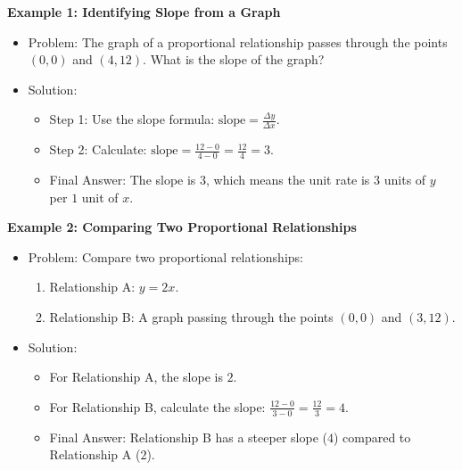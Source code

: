 \documentclass[12pt]{article}
\begin{document}
\begin{tcolorbox}[colframe=black!60, colback=white, 
coltitle=black, colbacktitle=black!15, fonttitle=\bfseries\Large, 
title=Examples, halign title=center, left=10pt, right=10pt, top=10pt, bottom=15pt]
\textbf{Example 1: Identifying Slope from a Graph}
\begin{itemize}
    \item Problem: The graph of a proportional relationship passes through the points \((0, 0)\) and \((4, 12)\). What is the slope of the graph?
    \item Solution:
    \begin{itemize}
        \item Step 1: Use the slope formula: \(\text{slope} = \frac{\Delta y}{\Delta x}\).
        \item Step 2: Calculate: \(\text{slope} = \frac{12 - 0}{4 - 0} = \frac{12}{4} = 3\).
        \item Final Answer: The slope is \(3\), which means the unit rate is \(3\) units of \(y\) per \(1\) unit of \(x\).
    \end{itemize}
\end{itemize}

\textbf{Example 2: Comparing Two Proportional Relationships}
\begin{itemize}
    \item Problem: Compare two proportional relationships:
    \begin{enumerate}
        \item Relationship A: \(y = 2x\).
        \item Relationship B: A graph passing through the points \((0, 0)\) and \((3, 12)\).
    \end{enumerate}
    \item Solution:
    \begin{itemize}
        \item For Relationship A, the slope is \(2\).
        \item For Relationship B, calculate the slope: \(\frac{12 - 0}{3 - 0} = \frac{12}{3} = 4\).
        \item Final Answer: Relationship B has a steeper slope (\(4\)) compared to Relationship A (\(2\)).
    \end{itemize}
\end{itemize}
\end{tcolorbox}

\vspace{1em}
\end{document}
